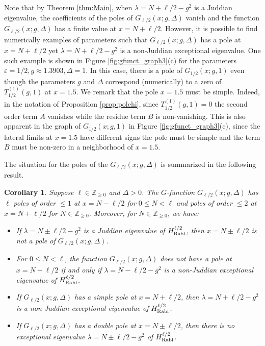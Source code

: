 \documentclass[11pt]{article}
\numberwithin{equation}{section}
\newcommand{\Z}{\mathbb{Z}} %
\newcommand{\e}{\varepsilon}
\newcommand{\HRabi}[1]{H_{\text{\upshape Rabi}}^{#1}} %
\theoremstyle{plain}
\newtheorem{cor}[thm]{Corollary}
\theoremstyle{definition}
\theoremstyle{remark}
\begin{document}
Note that by Theorem \ref{thm:Main}, when \(\lambda = N + \ell/2 - g^2 \) is a Juddian eigenvalue, the coefficients of the
poles of \(G_{\ell/2}(x;g,\Delta)\) vanish and the function \(G_{\ell/2}(x;g,\Delta)\) has a finite value at \(x = N+\ell/2 \). However, it is possible
to find numerically examples of parameters such that \(G_{\ell/2}(x;g,\Delta)\) has a pole at \(x = N+ \ell/2 \) yet \( \lambda= N + \ell/2 - g^2 \) is a
non-Juddian exceptional eigenvalue. One such example is shown in Figure \ref{fig:gfunct_graph3}(c) for the parameters
\(\e = 1/2, g \approx 1.3903, \Delta = 1 \). In this case, there is a pole of \(G_{1/2}(x;g,1)\) even though the parameters \(g\) and \(\Delta\) correspond
(numerically) to a zero of \(T_{1/2}^{(1)}(g,1)\)  at \(x = 1.5 \). We remark that the pole \(x = 1.5 \) must be simple.
Indeed, in the notation of Proposition \ref{prop:polehi}, since \(T_{1/2}^{(1)}(g,1)=0\) the second order term \(A\) vanishes while
the residue term \(B\) is non-vanishing. This is also apparent in the graph of \(G_{1/2}(x;g,1)\) in Figure \ref{fig:gfunct_graph3}(c), since the
lateral limits at \(x=1.5\) have different signs the pole must be simple and the term \(B\) must be non-zero in a neighborhood
of \(x=1.5\).

The situation for the poles of the \( G_{\ell/2}(x;g,\Delta)\) is summarized in the following result.

\begin{cor}

  Suppose \( \ell \in \Z_{\geq 0}\) and  \(\Delta>0 \). The $G$-function \( G_{\ell/2}(x;g,\Delta)\) has \(\ell\) poles of order \(\leq 1\)
  at \(x = N - \ell/2 \) for \(0 \leq N < \ell\) and poles of order \(\leq 2\) at \(x = N + \ell/2 \) for \(N \in \Z_{\geq 0}\). Moreover, for
  \(N \in \Z_{\geq 0} \), we have:
  \begin{itemize}
  \item If \(\lambda = N \pm \ell/2 -g^2\) is a Juddian eigenvalue of \(\HRabi{\ell/2}\), then \(x = N \pm \ell/2 \) is not a pole of \(G_{\ell/2}(x;g,\Delta) \).
  \item For \(0 \leq N < \ell \), the function \(G_{\ell/2}(x;g,\Delta) \) does not have a pole at \(x = N - \ell/2 \)  if and only if \(\lambda = N - \ell/2 - g^2 \) is a
    non-Juddian exceptional eigenvalue of \(\HRabi{\ell/2} \).
  \item If \(G_{\ell/2}(x;g,\Delta) \) has a simple pole at \(x = N + \ell/2 \), then \(\lambda = N + \ell/2 - g^2 \) is a non-Juddian exceptional eigenvalue
    of \(\HRabi{\ell/2} \).
  \item If \(G_{\ell/2}(x;g,\Delta) \) has a double pole at \(x = N \pm \ell/2 \), then there is no exceptional eigenvalue \(\lambda = N \pm \ell/2 - g^2\)
    of \(\HRabi{\ell/2} \).
  \end{itemize}
\end{cor}
\end{document}
